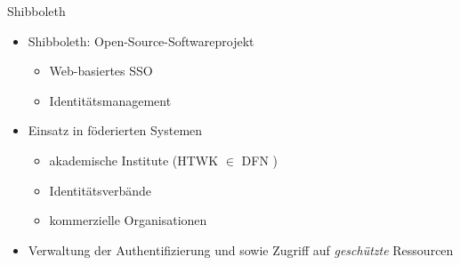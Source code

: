 \begin{frame}{Shibboleth}
    \begin{itemize}
        \item \alert{Shibboleth}: Open-Source-Softwareprojekt
        \begin{itemize}
            \item Web-basiertes SSO
            \item Identitätsmanagement \cite{shibbolethShibbolethConsortium2024, cantorConsortiumFAQShibboleth2023}
        \end{itemize}

        \pause

        \item Einsatz in föderierten Systemen
        \begin{itemize}
            \item akademische Institute (HTWK $\in$ DFN \cite{hochschulefuertechnikwirtschaftundkulturleipzigMedienOnlineNutzen})
            \item Identitätsverbände
            \item kommerzielle Organisationen \cite{shibbolethShibbolethConsortium2024, shibbolethOurMembers2024}
        \end{itemize}

        \pause

        \item Verwaltung der Authentifizierung und sowie Zugriff auf \emph{geschützte} Ressourcen \cite{cantorConsortiumFAQShibboleth2023}
    \end{itemize}
\end{frame}
